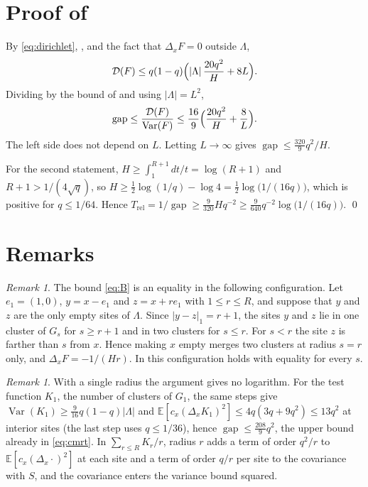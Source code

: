 \documentclass[11pt]{article}
\theoremstyle{remark}
\newtheorem{remark}[theorem]{Remark}
\newcommand{\E}{\mathbb E}
\newcommand{\1}{\mathbf 1}
\DeclareMathOperator{\Var}{Var}
\DeclareMathOperator{\gap}{gap}
\newcommand{\Trel}{T_{\mathrm{rel}}}
\begin{document}
\section{Proof of \texorpdfstring{}{Theorem 1.2}}

By \eqref{eq:dirichlet}, , and the fact that $\Delta_xF=0$ outside $\Lambda$,
\[
\mathcal D(F)\le q(1-q)\Bigl(|\Lambda|\,\frac{20q^2}{H}+8L\Bigr).
\]
Dividing by the bound of  and using $|\Lambda|=L^2$,
\[
\gap\le\frac{\mathcal D(F)}{\Var(F)}\le\frac{16}{9}\Bigl(\frac{20q^2}{H}+\frac8L\Bigr).
\]
The left side does not depend on $L$. Letting $L\to\infty$ gives $\gap\le\frac{320}{9}q^2/H$.

For the second statement, $H\ge\int_1^{R+1}dt/t=\log(R+1)$ and $R+1>1/(4\sqrt q)$, so $H\ge\frac12\log(1/q)-\log4=\frac12\log\bigl(1/(16q)\bigr)$, which is positive for $q\le1/64$. Hence $\Trel=1/\gap\ge\frac9{320}H q^{-2}\ge\frac9{640}q^{-2}\log\bigl(1/(16q)\bigr)$. \qed

\section{Remarks}

\begin{remark}
The bound \eqref{eq:B} is an equality in the following configuration. Let $e_1=(1,0)$, $y=x-e_1$ and $z=x+re_1$ with $1\le r\le R$, and suppose that $y$ and $z$ are the only empty sites of $\Lambda$. Since $|y-z|_1=r+1$, the sites $y$ and $z$ lie in one cluster of $G_s$ for $s\ge r+1$ and in two clusters for $s\le r$. For $s<r$ the site $z$ is farther than $s$ from $x$. Hence making $x$ empty merges two clusters at radius $s=r$ only, and $\Delta_xF=-1/(Hr)$. In this configuration  holds with equality for every $s$.
\end{remark}

\begin{remark}\label{rem:single}
With a single radius the argument gives no logarithm. For the test function $K_1$, the number of clusters of $G_1$, the same steps give $\Var(K_1)\ge\frac9{16}q(1-q)|\Lambda|$ and $\E[c_x(\Delta_xK_1)^2]\le4q(3q+9q^2)\le13q^2$ at interior sites (the last step uses $q\le1/36$), hence $\gap\le\frac{208}{9}q^2$, the upper bound already in \eqref{eq:cmrt}. In $\sum_{r\le R}K_r/r$, radius $r$ adds a term of order $q^2/r$ to $\E[c_x(\Delta_x\cdot)^2]$ at each site and a term of order $q/r$ per site to the covariance with $S$, and the covariance enters the variance bound squared.
\end{remark}
\end{document}
